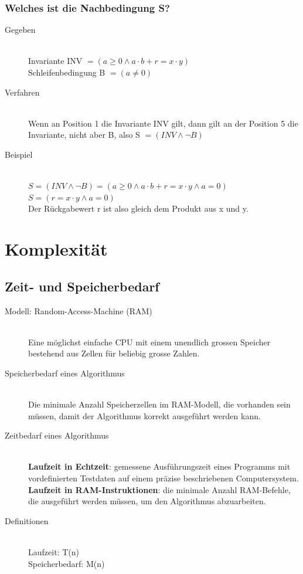 \documentclass[a4paper,10pt]{article}
\newcommand{\Bold}[1]{\textbf{#1}} %
\begin{document}
\subsubsection{Welches ist die Nachbedingung S?}
\begin{description}
	\item[Gegeben] \hfill \\
		Invariante INV $= (a \geq 0 \wedge a\cdot b + r = x\cdot y)$ \\
		Schleifenbedingung B $= (a \neq 0)$
	\item[Verfahren] \hfill \\
		Wenn an Position 1 die Invariante INV gilt, dann gilt an der Position 5 die Invariante, nicht aber B, also S $= (INV \wedge \neg B)$
	\item[Beispiel] \hfill \\
		$S = (INV \wedge \neg B) = (a \geq 0 \wedge a\cdot b + r = x\cdot y \wedge a = 0)$ \\
		$S = (r = x\cdot y \wedge a = 0)$ \\
		Der R\"uckgabewert r ist also gleich dem Produkt aus x und y.
\end{description}
\pagebreak
\section{Komplexit\"at}
\subsection{Zeit- und Speicherbedarf}
\begin{description}
	\item[Modell: Random-Access-Machine (RAM)] \hfill \\
		Eine m\"oglichst einfache CPU mit einem unendlich grossen Speicher bestehend aus Zellen f\"ur beliebig grosse Zahlen.
		\item[Speicherbedarf eines Algorithmus] \hfill \\
			Die minimale Anzahl Speicherzellen im RAM-Modell, die vorhanden sein m\"ussen, damit der Algorithmus korrekt ausgef\"uhrt werden kann.
		\item[Zeitbedarf eines Algorithmus] \hfill \\
			\Bold {Laufzeit in Echtzeit}: gemessene Ausf\"uhrungszeit eines Programms mit vordefinierten Testdaten auf einem pr\"azise beschriebenen Computersystem. \\
			\Bold {Laufzeit in RAM-Instruktionen}: die minimale Anzahl RAM-Befehle, die ausgef\"uhrt werden m\"ussen, um den Algorithmus abzuarbeiten.
		\item[Definitionen] \hfill \\
			Laufzeit: T(n) \\
			Speicherbedarf: M(n)
\end{description}
\end{document}
